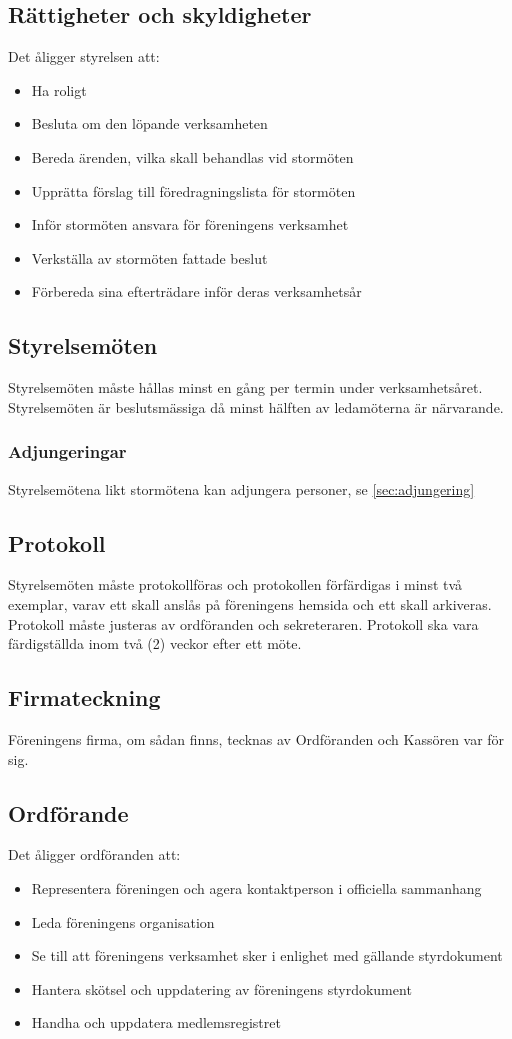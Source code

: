 \documentclass[11pt,a4paper]{article}
\begin{document}
\subsection{Rättigheter och skyldigheter}
Det åligger styrelsen att:
\begin{itemize}
	\item Ha roligt
	\item Besluta om den löpande verksamheten
	\item Bereda ärenden, vilka skall behandlas vid stormöten
	\item Upprätta förslag till föredragningslista för stormöten
	\item Inför stormöten ansvara för föreningens verksamhet
	\item Verkställa av stormöten fattade beslut
	\item Förbereda sina efterträdare inför deras verksamhetsår
\end{itemize}
\subsection{Styrelsemöten}
Styrelsemöten måste hållas minst en gång per termin under verksamhetsåret. Styrelsemöten är beslutsmässiga då minst hälften av ledamöterna är närvarande.
\subsubsection{Adjungeringar}
Styrelsemötena likt stormötena kan adjungera personer, se \ref{sec:adjungering}
\subsection{Protokoll}
Styrelsemöten måste protokollföras och protokollen förfärdigas i minst två exemplar, varav ett skall anslås på föreningens hemsida och ett skall arkiveras. Protokoll måste justeras av ordföranden och sekreteraren. Protokoll ska vara färdigställda inom två (2) veckor efter ett möte.
\subsection{Firmateckning}
Föreningens firma, om sådan finns, tecknas av Ordföranden och Kassören var för sig.
\subsection{Ordförande}\label{sec:ordf}
Det åligger ordföranden att:
\begin{itemize}
	\item Representera föreningen och agera kontaktperson i officiella sammanhang
	\item Leda föreningens organisation
	\item Se till att föreningens verksamhet sker i enlighet med gällande styrdokument
	\item Hantera skötsel och uppdatering av föreningens styrdokument
	\item Handha och uppdatera medlemsregistret
\end{itemize}
\end{document}
